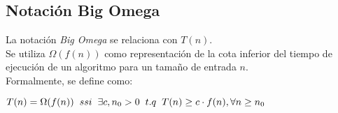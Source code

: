 \subsection{Notación Big Omega}
La notación \textit{Big Omega} se relaciona con $T(n)$.\\

Se utiliza $\Omega(f(n))$ como representación de la cota inferior del tiempo de
ejecución de un algoritmo para un tamaño de entrada $n$.\\

Formalmente, se define como:

\begin{center}
  \(T(n) = \Omega(f(n))\hspace{0.2cm}ssi\hspace{0.2cm}\exists c, n_{0} > 0\hspace{0.2cm}t.q\hspace{0.2cm}T(n) \geq c\cdot f(n), \forall{n} \geq n_{0}\)
\end{center}
